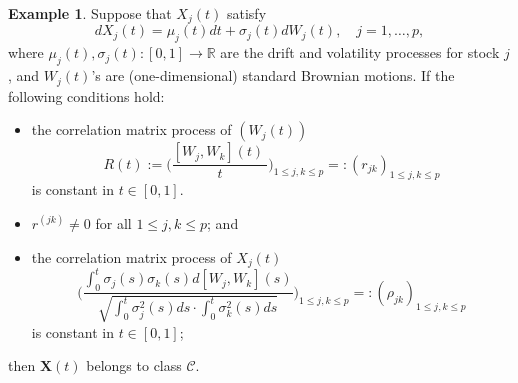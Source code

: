 \documentclass[a4paper,11pt]{article}
\theoremstyle{plain}
\theoremstyle{definition}
\newtheorem{exmp}[thm]{Example}
\newcommand{\MR}{\mathbb{R}}
\begin{document}
    \begin{exmp} \label{exmp C}
    	Suppose that $X_j(t)$ satisfy
    	\[ dX_j(t) = \mu_j(t) dt + \sigma_j(t) dW_j(t), \quad j = 1, \dots, p, \]
    	where $\mu_j(t), \sigma_j(t) : [0, 1] \rightarrow \MR$ are the drift and volatility processes for stock $j$, and $W_j(t)$'s are  (one-dimensional) standard Brownian motions. If the following conditions hold:
    	\begin{itemize}
    		\item the correlation matrix process of $(W_j(t))$
    		\[ R(t):= \bigg(\frac{ [W_j, W_k](t) \ }{t}\bigg)_{1 \leq j,k \leq p} =:(r_{jk})_{1 \leq j,k \leq p} \]
    		is constant in $t \in [0, 1]$.
    		\item $r^{(jk)} \neq 0$ for all $1 \leq j,k \leq p$; and
    		\item the correlation matrix process of $X_j(t)$
    		\[ \Bigg( \frac{\int_{0}^{t} \sigma_j(s) \sigma_k(s)  d[W_j, W_k](s) }{\sqrt{\int_{0}^{t} \sigma_j^2(s) ds \cdot \int_{0}^{t} \sigma_k^2(s) ds}} \Bigg)_{1 \leq j,k \leq p}  =:(\rho_{jk})_{1 \leq j,k \leq p}  \]
    		is constant in $t \in [0, 1]$;
    	\end{itemize}
    	then $\mathbf{X}(t)$ belongs to class $\mathcal{C}$.
    	

\end{exmp}
\end{document}
